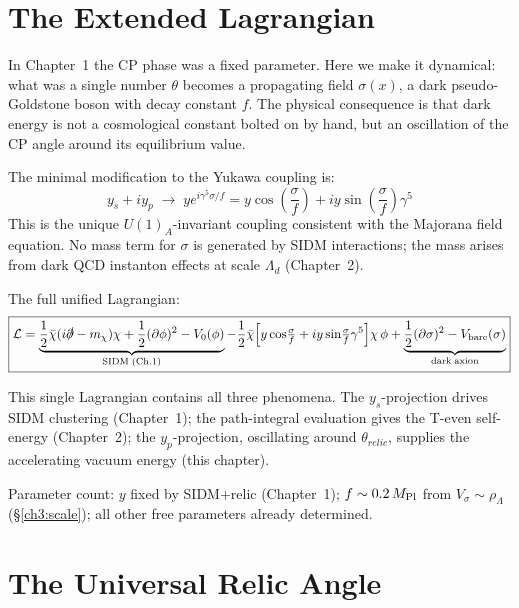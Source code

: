 \section{The Extended Lagrangian}
\label{ch3:lagrangian}

In Chapter~1 the CP phase was a fixed parameter. Here we make it dynamical:
what was a single number $\theta$ becomes a propagating field $\sigma(x)$,
a dark pseudo-Goldstone boson with decay constant $f$. The physical
consequence is that dark energy is not a cosmological constant bolted on by hand,
but an oscillation of the CP angle around its equilibrium value.

The minimal modification to the Yukawa coupling is:
\begin{equation}
  y_s + iy_p \;\longrightarrow\; ye^{i\gamma^5\sigma/f}
  = y\cos\!\left(\frac{\sigma}{f}\right) + iy\sin\!\left(\frac{\sigma}{f}\right)\gamma^5
\end{equation}
This is the unique $U(1)_A$-invariant coupling consistent with the Majorana
field equation. No mass term for $\sigma$ is generated by SIDM interactions;
the mass arises from dark QCD instanton effects at scale $\Lambda_d$ (Chapter~2).

The full unified Lagrangian:
\begin{equation}
  \boxed{\mathcal{L} = \underbrace{\frac{1}{2}\bar{\chi}(i\slashed{\partial} - m_\chi)\chi
    + \frac{1}{2}(\partial\phi)^2 - V_0(\phi)}_{\rm SIDM\;(Ch.1)}
    - \frac{1}{2}\bar{\chi}\!\left[y\cos\!\tfrac{\sigma}{f}
      + iy\sin\!\tfrac{\sigma}{f}\gamma^5\right]\!\chi\,\phi
    + \underbrace{\frac{1}{2}(\partial\sigma)^2 - V_{\rm bare}(\sigma)}_{\rm dark\;axion}}
\end{equation}

This single Lagrangian contains all three phenomena. The $y_s$-projection
drives SIDM clustering (Chapter~1); the path-integral evaluation gives the
T-even self-energy (Chapter~2); the $y_p$-projection, oscillating around
$\theta_{relic}$, supplies the accelerating vacuum energy (this chapter).

Parameter count: $y$ fixed by SIDM+relic (Chapter~1); $f \sim 0.2\,M_{\rm Pl}$ from
$V_\sigma \sim \rho_\Lambda$ (§\ref{ch3:scale}); all other free parameters already determined.

\section{The Universal Relic Angle}
\label{ch3:thetarel}

